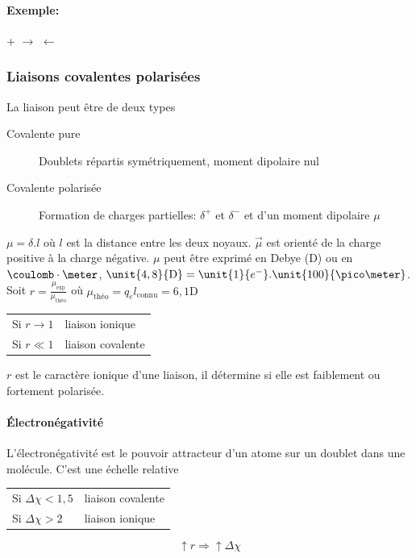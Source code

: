 \documentclass[11pt,a4paper,french]{article}
\newcommand\debye{\mathrm{D}}
\begin{document}
\paragraph{Exemple:}
\begin{center}
	\hspace{0.3cm} + \hspace{0.3cm}$\longrightarrow$ $\leftarrow$
\end{center}
\subsubsection{Liaisons covalentes polarisées}
La liaison peut être de deux types
\begin{description}
	\item[Covalente pure] Doublets répartis symétriquement, moment dipolaire nul
	\item[Covalente polarisée] Formation de charges partielles: $\delta^+$ et $\delta^-$ et d'un moment dipolaire $\mu$
\end{description}
$\mu = \delta . l$ où $l$ est la distance entre les deux noyaux.
$\vec{\mu}$ est orienté de la charge positive à la charge négative.
$\mu$ peut être exprimé en Debye ($\debye$) ou en $\coulomb\cdot\meter$, $\unit{4,8}{\debye} = \unit{1}{e^-} . \unit{100}{\pico\meter}$.
Soit $r = \frac{\mu_{\mathrm{exp}}}{\mu_{\textrm{théo}}}$ où $\mu_{\textrm{théo}} = q_e l_{\mathrm{connu}} = \unit{6,1}{\debye}$
\begin{center}
	\begin{tabular}{ll}
		Si $r \to 1$ & liaison ionique\\
		Si $r \ll 1$ & liaison covalente
	\end{tabular}
\end{center}
$r$ est le caractère ionique d'une liaison, il détermine si elle est faiblement ou fortement polarisée.

\paragraph{\'Electronégativité}
L'électronégativité est le pouvoir attracteur d'un atome sur un doublet dans une molécule.
C'est une échelle relative
\begin{center}
	\begin{tabular}{ll}
		Si $\Delta \chi < 1,5$ & liaison covalente\\
		Si $\Delta \chi > 2$ & liaison ionique
	\end{tabular}
\end{center}
$$\uparrow r \Rightarrow \uparrow \Delta \chi$$
\end{document}
